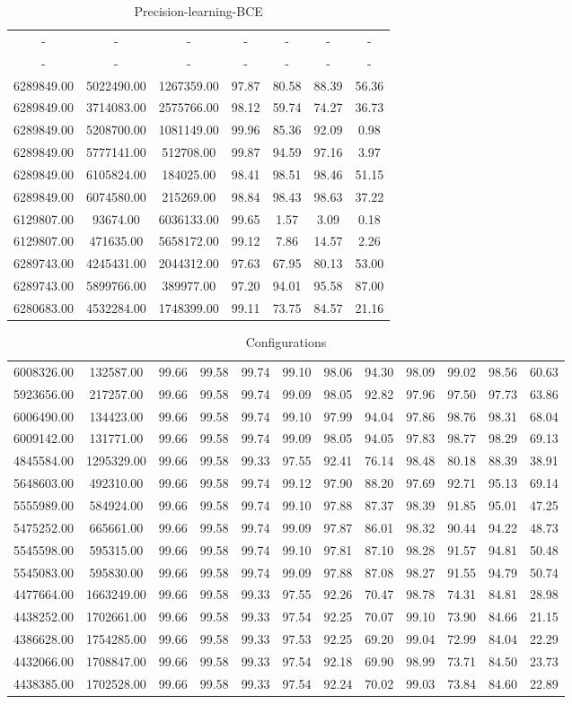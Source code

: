 \begin{table}
\caption{Precision-learning-BCE}
\begin{tabular}{ccccccc}
-& -& -& -& -& -& -\tabularnewline
-& -& -& -& -& -& -\tabularnewline
6289849.00& 5022490.00& 1267359.00& 97.87& 80.58& 88.39& 56.36\tabularnewline
6289849.00& 3714083.00& 2575766.00& 98.12& 59.74& 74.27& 36.73\tabularnewline
6289849.00& 5208700.00& 1081149.00& 99.96& 85.36& 92.09& 0.98\tabularnewline
6289849.00& 5777141.00& 512708.00& 99.87& 94.59& 97.16& 3.97\tabularnewline
6289849.00& 6105824.00& 184025.00& 98.41& 98.51& 98.46& 51.15\tabularnewline
6289849.00& 6074580.00& 215269.00& 98.84& 98.43& 98.63& 37.22\tabularnewline
6129807.00& 93674.00& 6036133.00& 99.65& 1.57& 3.09& 0.18\tabularnewline
6129807.00& 471635.00& 5658172.00& 99.12& 7.86& 14.57& 2.26\tabularnewline
6289743.00& 4245431.00& 2044312.00& 97.63& 67.95& 80.13& 53.00\tabularnewline
6289743.00& 5899766.00& 389977.00& 97.20& 94.01& 95.58& 87.00\tabularnewline
6280683.00& 4532284.00& 1748399.00& 99.11& 73.75& 84.57& 21.16\tabularnewline
\end{tabular}
\end{table}
\begin{table}
\caption{Configurations}
\begin{tabular}{cccccccccccc}
6008326.00& 132587.00& 99.66& 99.58& 99.74& 99.10& 98.06& 94.30& 98.09& 99.02& 98.56& 60.63\tabularnewline
5923656.00& 217257.00& 99.66& 99.58& 99.74& 99.09& 98.05& 92.82& 97.96& 97.50& 97.73& 63.86\tabularnewline
6006490.00& 134423.00& 99.66& 99.58& 99.74& 99.10& 97.99& 94.04& 97.86& 98.76& 98.31& 68.04\tabularnewline
6009142.00& 131771.00& 99.66& 99.58& 99.74& 99.09& 98.05& 94.05& 97.83& 98.77& 98.29& 69.13\tabularnewline
4845584.00& 1295329.00& 99.66& 99.58& 99.33& 97.55& 92.41& 76.14& 98.48& 80.18& 88.39& 38.91\tabularnewline
5648603.00& 492310.00& 99.66& 99.58& 99.74& 99.12& 97.90& 88.20& 97.69& 92.71& 95.13& 69.14\tabularnewline
5555989.00& 584924.00& 99.66& 99.58& 99.74& 99.10& 97.88& 87.37& 98.39& 91.85& 95.01& 47.25\tabularnewline
5475252.00& 665661.00& 99.66& 99.58& 99.74& 99.09& 97.87& 86.01& 98.32& 90.44& 94.22& 48.73\tabularnewline
5545598.00& 595315.00& 99.66& 99.58& 99.74& 99.10& 97.81& 87.10& 98.28& 91.57& 94.81& 50.48\tabularnewline
5545083.00& 595830.00& 99.66& 99.58& 99.74& 99.09& 97.88& 87.08& 98.27& 91.55& 94.79& 50.74\tabularnewline
4477664.00& 1663249.00& 99.66& 99.58& 99.33& 97.55& 92.26& 70.47& 98.78& 74.31& 84.81& 28.98\tabularnewline
4438252.00& 1702661.00& 99.66& 99.58& 99.33& 97.54& 92.25& 70.07& 99.10& 73.90& 84.66& 21.15\tabularnewline
4386628.00& 1754285.00& 99.66& 99.58& 99.33& 97.53& 92.25& 69.20& 99.04& 72.99& 84.04& 22.29\tabularnewline
4432066.00& 1708847.00& 99.66& 99.58& 99.33& 97.54& 92.18& 69.90& 98.99& 73.71& 84.50& 23.73\tabularnewline
4438385.00& 1702528.00& 99.66& 99.58& 99.33& 97.54& 92.24& 70.02& 99.03& 73.84& 84.60& 22.89\tabularnewline
\end{tabular}
\end{table}
